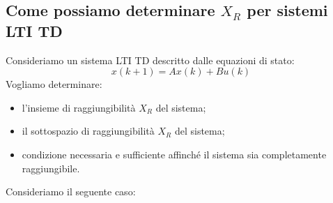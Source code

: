 \subsection{Come possiamo determinare $X_R$ per sistemi LTI TD}
Consideriamo un sistema LTI TD descritto dalle equazioni di stato:
\begin{equation}
    x(k+1) = A x(k) + B u(k)
\end{equation}
Vogliamo determinare:
\begin{itemize}
    \item l'insieme di raggiungibilità $X_R$ del sistema;
    \item il sottospazio di raggiungibilità $X_R$ del sistema;
    \item condizione necessaria e sufficiente affinché il sistema sia completamente
          raggiungibile.
\end{itemize}
Consideriamo il seguente caso:
